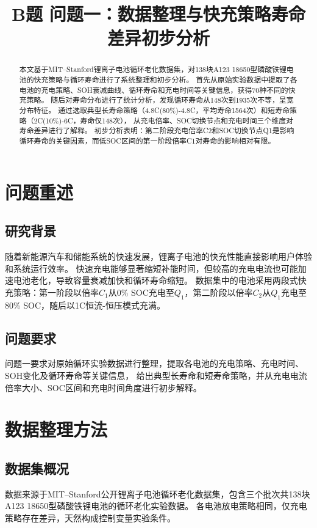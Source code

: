 \documentclass[withoutpreface]{cumcmthesis}
\title{B题 问题一：数据整理与快充策略寿命差异初步分析}
\begin{document}
\maketitle

\begin{abstract}
本文基于MIT--Stanford锂离子电池循环老化数据集，对138块A123 18650型磷酸铁锂电池的快充策略与循环寿命进行了系统整理和初步分析。
首先从原始实验数据中提取了各电池的充电策略、SOH衰减曲线、循环寿命和充电时间等关键信息，获得70种不同的快充策略。
随后对寿命分布进行了统计分析，发现循环寿命从148次到1935次不等，呈宽分布特征。
通过选取典型长寿命策略（4.8C(80\%)-4.8C，平均寿命1564次）和短寿命策略（2C(10\%)-6C，寿命仅148次），
从充电倍率、SOC切换节点和充电时间三个维度对寿命差异进行了解释。
初步分析表明：第二阶段充电倍率C2和SOC切换节点Q1是影响循环寿命的关键因素，而低SOC区间的第一阶段倍率C1对寿命的影响相对有限。
\end{abstract}

\section{问题重述}

\subsection{研究背景}
随着新能源汽车和储能系统的快速发展，锂离子电池的快充性能直接影响用户体验和系统运行效率。
快速充电能够显著缩短补能时间，但较高的充电电流也可能加速电池老化，导致容量衰减加快和循环寿命缩短。
数据集中的电池采用两段式快充策略：第一阶段以倍率$C_1$从0\% SOC充电至$Q_1$，第二阶段以倍率$C_2$从$Q_1$充电至80\% SOC，随后以1C恒流-恒压模式充满。

\subsection{问题要求}
问题一要求对原始循环实验数据进行整理，提取各电池的充电策略、充电时间、SOH变化及循环寿命等关键信息，
给出典型长寿命和短寿命策略，并从充电电流倍率大小、SOC区间和充电时间角度进行初步解释。

\section{数据整理方法}

\subsection{数据集概况}
数据来源于MIT--Stanford公开锂离子电池循环老化数据集\cite{severson2019}，包含三个批次共138块A123 18650型磷酸铁锂电池的循环老化实验数据。
各电池放电策略相同，仅充电策略存在差异，天然构成控制变量实验条件。
\end{document}
